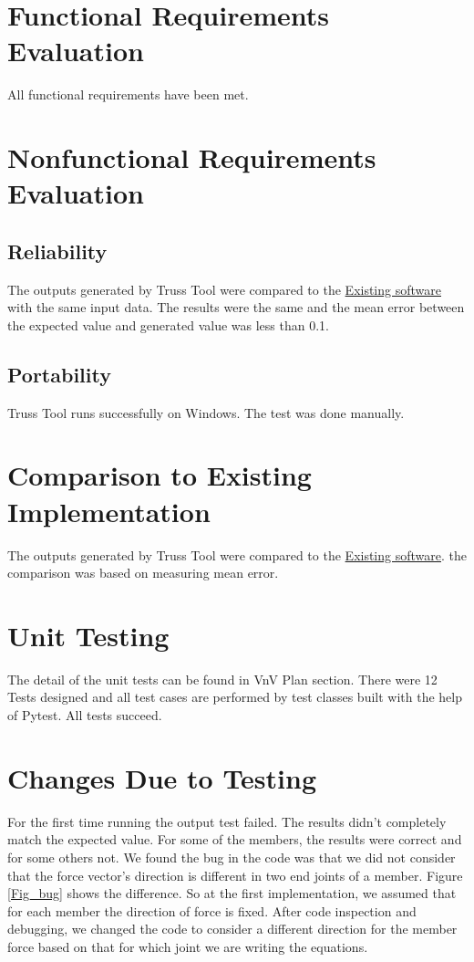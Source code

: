 \documentclass[12pt, titlepage]{article}
\begin{document}
\section{Functional Requirements Evaluation} \label{sec_f}

All functional requirements have been met.

\section{Nonfunctional Requirements Evaluation} \label{sec_nonf}

\subsection{Reliability}
The outputs generated by Truss Tool were compared to the \href{https://valdivia.staff.jade-hs.de/fachwerk_en.html}{Existing software} with the same input data. The results were the same and the mean error between the expected value and generated value was less than 0.1.
		
\subsection{Portability}

Truss Tool runs successfully on Windows. The test was done manually.
	
\section{Comparison to Existing Implementation}	

The outputs generated by Truss Tool were compared to the \href{https://valdivia.staff.jade-hs.de/fachwerk_en.html}{Existing software}. the comparison was based on measuring mean error.

\section{Unit Testing}
The detail of the unit tests can be found in VnV Plan section. There were 12 Tests designed and all test cases are performed by test classes built with the help of Pytest. All tests succeed.

\section{Changes Due to Testing}
For the first time running the output test failed. The results didn't completely match the expected value. For some of the members, the results were correct and for some others not. We found the bug in the code was that we did not consider that the force vector's direction is different in two end joints of a member. Figure \ref{Fig_bug} shows the difference. So at the first implementation, we assumed that for each member the direction of force is fixed. After code inspection and debugging, we changed the code to consider a different direction for the member force based on that for which joint we are writing the equations.  
\end{document}
